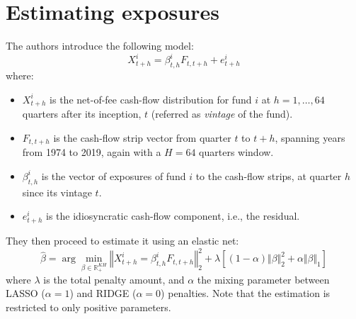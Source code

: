 \documentclass[12pt]{article}
\begin{document}
\section{Estimating exposures}\label{sec:estimating-exposures}
    The authors introduce the following model:
    \begin{equation}
        X_{t+h}^i = \beta^i_{t,h} F_{t,t+h} +e^i_{t+h}
        \label{eq:exposures}
    \end{equation}
    where:
    \begin{itemize}
        \item $X_{t+h}^i$ is the net-of-fee cash-flow distribution for fund $i$ at $h=1,\hdots, 64$ quarters after its inception, $t$ (referred as \textit{vintage} of the fund).
        \item $F_{t,t+h}$ is the cash-flow strip vector from quarter $t$ to $t+h$, spanning years from 1974 to 2019, again with a $H=64$ quarters window.
        \item $\beta^i_{t,h}$ is the vector of exposures of fund $i$ to the cash-flow strips, at quarter $h$ since its vintage $t$.
        \item $e^i_{t+h}$ is the idiosyncratic cash-flow component, i.e., the residual.
    \end{itemize}
    They then proceed to estimate it using an elastic net:
    \begin{equation}
        \hat \beta = \arg \min _{\beta \in \mathbb R^{KH}_+} \left \Vert X_{t+h}^i = \beta^i_{t,h} F_{t,t+h} \right \Vert_2^2 + \lambda \left[(1-\alpha)\Vert \beta \Vert_2^2 + \alpha \Vert \beta \Vert_1\right]
        \label{eq:elastic-net}
    \end{equation}
    where $\lambda$ is the total penalty amount, and $\alpha$ the mixing parameter between LASSO ($\alpha =1$) and RIDGE ($\alpha =0$) penalties.
    Note that the estimation is restricted to only positive parameters.
\end{document}
